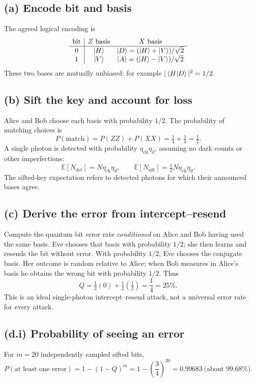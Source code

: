 
\subsection*{(a) Encode bit and basis}
The agreed logical encoding is
\[
\begin{array}{c|cc}
\text{bit}&Z\ \text{basis}&X\ \text{basis}\\\hline
0&\left\lvert H\right\rangle&\left\lvert D\right\rangle=(\left\lvert H\right\rangle+\left\lvert V\right\rangle)/\sqrt2\\
1&\left\lvert V\right\rangle&\left\lvert A\right\rangle=(\left\lvert H\right\rangle-\left\lvert V\right\rangle)/\sqrt2
\end{array}
\]
These two bases are mutually unbiased:
for example \(|\left\langle H\middle\vert D\right\rangle|^2=1/2\).

\subsection*{(b) Sift the key and account for loss}
Alice and Bob choose each basis with probability \(1/2\).
The probability of matching choices is
\[
P(\text{match})=P(ZZ)+P(XX)=\tfrac14+\tfrac14
=\boxed{\tfrac12}.
\]
A single photon is detected with probability
\(\eta_{\mathrm{ch}}\eta_d\), assuming no
dark counts or other imperfections:
\[
\boxed{\mathbb{E}[N_{\mathrm{det}}]
=N\eta_{\mathrm{ch}}\eta_d},\qquad
\boxed{\mathbb{E}[N_{\mathrm{sift}}]
=\tfrac12N\eta_{\mathrm{ch}}\eta_d}.
\]
The sifted-key expectation refers to detected
photons for which their announced bases agree.

\subsection*{(c) Derive the error from intercept--resend}
Compute the quantum bit error rate \emph{conditioned}
on Alice and Bob having used the same basis.
Eve chooses that basis with probability \(1/2\);
she then learns and resends the bit without error.
With probability \(1/2\), Eve chooses the
conjugate basis. Her outcome is random relative
to Alice; when Bob measures in Alice's basis
he obtains the wrong bit with probability \(1/2\).
Thus
\[
\boxed{Q=\tfrac12(0)+\tfrac12(\tfrac12)
=\frac14=25\%.}
\]
This is an ideal single-photon intercept--resend
attack, not a universal error rate for every attack.

\subsection*{(d.i) Probability of seeing an error}
For \(m=20\) independently sampled sifted bits,
\[
\boxed{P(\text{at least one error})
=1-(1-Q)^m=1-\left(\frac34\right)^{20}
=0.99683\ \text{(about }99.68\%\text{)}.}
\]


